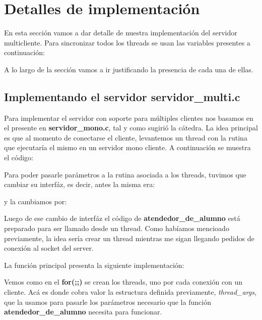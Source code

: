 \section{Detalles de implementaci\'on}
\label{sec:Imp}
En esta secci\'on vamos a dar detalle de nuestra implementaci\'on del servidor multicliente. Para sincronizar todos los threads se usan las variables presentes a continuaci\'on:



A lo largo de la secci\'on vamos a ir justificando la presencia de cada una de ellas.

\subsection{Implementando el servidor \textbf{servidor\_multi.c}}
Para implementar el servidor con soporte para m\'ultiples clientes nos basamos en el presente en \textbf{servidor\_mono.c}, tal y como sugiri\'o la c\'atedra.
La idea principal es que al momento de conectarse el cliente, levantemos un thread con la rutina que ejecutar\'ia el mismo en un servidor mono cliente. A continuaci\'on se muestra el c\'odigo:



Para poder pasarle par\'ametros a la rutina asociada a los threads, tuvimos que cambiar su interf\'az, es decir, antes la misma era:



y la cambiamos por:



Luego de ese cambio de interf\'az el c\'odigo de \textbf{atendedor\_de\_alumno} est\'a preparado para ser llamado desde un thread. Como hab\'iamos mencioado previamente, la idea ser\'ia crear un thread mientras me sigan llegando pedidos de conexi\'on al socket del server.

La funci\'on principal presenta la siguiente implementaci\'on:



Vemos como en el \textbf{for(;;)} se crean los threads, uno por cada conexi\'on con un cliente. Ac\'a es donde cobra valor la estructura definida previamente, \emph{thread\_args}, que la usamos para pasarle los par\'ametros necesario que la funci\'on \textbf{atendedor\_de\_alumno} necesita para funcionar.

